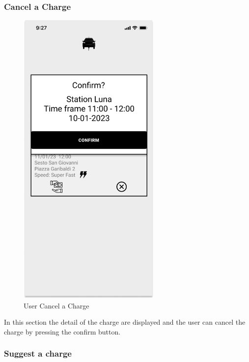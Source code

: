 \subsubsection{Cancel a Charge}
\begin{figure}[H]
    \centering
    \includegraphics[keepaspectratio, height=15cm]{Mockup/UserAppInterface/Delete Charge.png}
    \caption{User Cancel a Charge}
    \label{pop:Delete}
\end{figure}
In this section the detail of the charge are displayed and the user can cancel the charge by pressing the confirm button.

\subsubsection{Suggest a charge}

